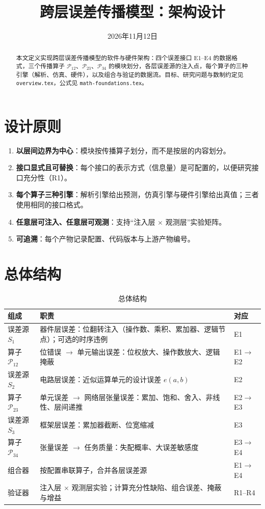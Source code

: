 \documentclass[11pt,a4paper]{ctexart}
\title{跨层误差传播模型：架构设计}
\date{2026年11月12日}
\begin{document}
\maketitle

\begin{abstract}
本文定义实现跨层误差传播模型的软件与硬件架构：四个误差接口 E1--E4 的数据格式，三个传播算子 $\mathcal P_{12}$、$\mathcal P_{23}$、$\mathcal P_{34}$ 的模块划分，各层误差源的注入点，每个算子的三种引擎（解析、仿真、硬件），以及组合与验证的数据流。目标、研究问题与数制约定见 \texttt{overview.tex}，公式见 \texttt{math-foundations.tex}。
\end{abstract}

\section{设计原则}
\begin{enumerate}[leftmargin=*]
  \item \textbf{以层间边界为中心}：模块按传播算子划分，而不是按层的内容划分。
  \item \textbf{接口显式且可替换}：每个接口的表示方式（信息量）是可配置的，以便研究接口充分性（R1）。
  \item \textbf{每个算子三种引擎}：解析引擎给出预测，仿真引擎与硬件引擎给出真值；三者使用相同的接口格式。
  \item \textbf{任意层可注入、任意层可观测}：支持“注入层 $\times$ 观测层”实验矩阵。
  \item \textbf{可追溯}：每个产物记录配置、代码版本与上游产物编号。
\end{enumerate}

\section{总体结构}

\begin{table}[h]
\centering
\small
\begin{tabularx}{\textwidth}{@{}lXl@{}}
\toprule
组成 & 职责 & 对应 \\
\midrule
误差源 $S_1$ & 器件层误差：位翻转注入（操作数、乘积、累加器、逻辑节点）；可选的时序违例 & E1 \\
算子 $\mathcal P_{12}$ & 位错误 $\to$ 单元输出误差：位权放大、操作数放大、逻辑掩蔽 & E1$\to$E2 \\
误差源 $S_2$ & 电路层误差：近似运算单元的设计误差 $e(a,b)$ & E2 \\
算子 $\mathcal P_{23}$ & 单元误差 $\to$ 网络层张量误差：累加、饱和、舍入、非线性、层间递推 & E2$\to$E3 \\
误差源 $S_3$ & 框架层误差：累加器截断、位宽缩减 & E3 \\
算子 $\mathcal P_{34}$ & 张量误差 $\to$ 任务质量：失配概率、大误差敏感度 & E3$\to$E4 \\
组合器 & 按配置串联算子，合并各层误差源 & E1$\to$E4 \\
验证器 & 注入层 $\times$ 观测层实验；计算充分性缺陷、组合误差、掩蔽与增益 & R1--R4 \\
\bottomrule
\end{tabularx}
\caption{总体结构}
\end{table}
\end{document}
